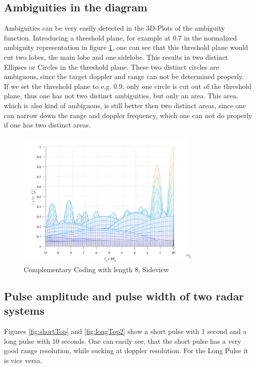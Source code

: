 \subsection{Ambiguities in the diagram}
Ambiguities can be very easily detected in the 3D-Plots of the ambiguity function. Introducing a threshold plane, for example at 0.7 in the normalized ambiguity representation in figure \ref{fig:compl8_side}, one can see that this threshold plane would cut two lobes, the main lobe and one sidelobe. This results in two distinct Ellipses or Circles in the threshold plane. These two distinct circles are ambiguous, since the target doppler and range can not be determined properly.\\
If we set the threshold plane to e.g. 0.9, only one circle is cut out of the threshold plane, thus one has not two distinct ambiguities, but only an area. This area, which is also kind of ambiguous, is still better then two distinct areas, since one can narrow down the range and doppler frequency, which one can not do properly if one has two distinct areas.


\begin{figure}
	\centering
	\includegraphics[width=0.8\textwidth]{images/compl8_3D-side}
	\caption{Complementary Coding with length 8, Sideview}
	\label{fig:compl8_side}
\end{figure}


\subsection{Pulse amplitude and pulse width of two radar systems}
Figures \ref{fig:shortTop} and \ref{fig:longTop2} show a short pulse with 1 second and a long pulse with 10 seconds. One can easily see, that the short pulse has a very good range resolution, while sucking at doppler resolution. For the Long Pulse it is vice versa.

